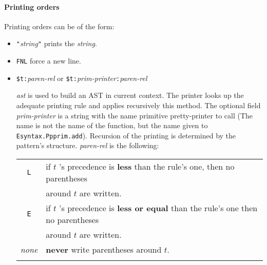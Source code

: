 \paragraph{Printing orders}
Printing orders can be of the form:
\begin{itemize}
\item \verb+"+{\sl string}\verb+"+ prints the {\sl string}.
\item \verb+FNL+ force a new line.

\item \texttt{\$t:}\textsl{paren-rel} or
  \texttt{\$t:}\textsl{prim-printer}\texttt{:}\textsl{paren-rel}

  {\sl ast} is used to build an AST in current context. The printer
  looks up the adequate printing rule and applies recursively this
  method.  The optional field {\it prim-printer} is a string with the
  name primitive pretty-printer to call (The name is not the name of
  the {\ocaml} function, but the name given to {\tt
  Esyntax.Ppprim.add}).  Recursion of the printing is determined by
  the pattern's structure.  {\it paren-rel} is the following:

\begin{tabular}{cl}

\verb+L+ &
    if $t$ 's precedence is {\bf less} than the rule's one, then no
    parentheses \\
  & around $t$ are written. \\
\verb+E+  &
    if $t$ 's precedence is {\bf less or equal} than  the rule's one
    then no parentheses \\
 &  around $t$ are written. \\
{\it none} & {\bf never} write parentheses around $t$.
\\\\
\end{tabular}
\end{itemize}

